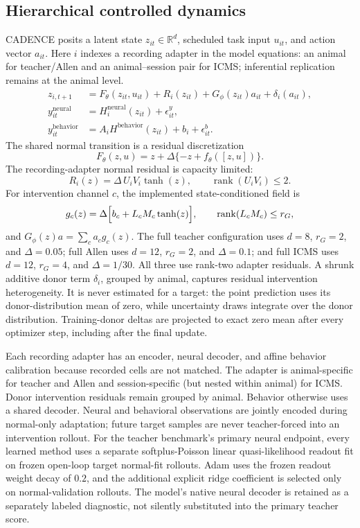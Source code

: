 \documentclass[11pt]{article}
\newcommand{\R}{\mathbb{R}}
\newcommand{\normal}{\mathrm{normal}}
\begin{document}
\subsection{Hierarchical controlled dynamics}

CADENCE posits a latent state \(z_{it}\in\R^d\), scheduled task input \(u_{it}\),
and action vector \(a_{it}\). Here \(i\) indexes a recording adapter in the
model equations: an animal for teacher/Allen and an animal--session pair for
ICMS; inferential replication remains at the animal level.
\begin{align}
  z_{i,t+1}
    &= F_\theta(z_{it},u_{it})
       + R_i(z_{it})
       + G_\phi(z_{it})a_{it}
       + \delta_i(a_{it}),
       \label{eq:dynamics}\\
  y^{\mathrm{neural}}_{it}
    &= H_i^{\mathrm{neural}}(z_{it})+\epsilon^{y}_{it},\\
  y^{\mathrm{behavior}}_{it}
    &= A_i H^{\mathrm{behavior}}(z_{it})+b_i+\epsilon^{b}_{it}.
    \label{eq:observations}
\end{align}
The shared normal transition is a residual discretization
\[
  F_\theta(z,u)=z+\Delta\{-z+f_\theta([z,u])\}.
\]
The recording-adapter normal residual is capacity limited:
\[
  R_i(z)=\Delta\,U_iV_i\tanh(z),
  \qquad
  \operatorname{rank}(U_iV_i)\leq 2.
\]
For intervention channel \(c\), the implemented state-conditioned field is
\begin{equation}
  g_c(z)
  =
  \Delta\Bigl[
    b_c+L_cM_c\tanh(z)
  \Bigr],
  \qquad
  \operatorname{rank}(L_cM_c)\leq r_G,
  \label{eq:lowrankG}
\end{equation}
and \(G_\phi(z)a=\sum_c a_c g_c(z)\). The full teacher configuration uses
\(d=8\), \(r_G=2\), and \(\Delta=0.05\); full Allen uses
\(d=12\), \(r_G=2\), and \(\Delta=0.1\); and full ICMS uses
\(d=12\), \(r_G=4\), and \(\Delta=1/30\). All three use rank-two adapter
residuals. A shrunk additive donor term \(\delta_i\), grouped by animal,
captures residual intervention
heterogeneity. It is never estimated for a target: the point prediction uses
its donor-distribution mean of zero, while uncertainty draws integrate over
the donor distribution. Training-donor deltas are projected to exact zero mean
after every optimizer step, including after the final update.

Each recording adapter has an encoder, neural decoder, and affine behavior
calibration because recorded cells are not matched. The adapter is
animal-specific for teacher and Allen and session-specific (but nested within
animal) for ICMS. Donor intervention residuals remain grouped by animal.
Behavior otherwise uses a shared decoder. Neural and behavioral observations are
jointly encoded during normal-only adaptation; future target samples are never
teacher-forced into an intervention rollout.
For the teacher benchmark's primary neural endpoint, every learned method uses
a separate softplus-Poisson linear quasi-likelihood readout fit on frozen
open-loop target \(\normal\)-fit rollouts. Adam uses the frozen readout weight
decay of \(0.2\), and the additional explicit ridge coefficient is selected
only on \(\normal\)-validation rollouts. The model's native neural decoder is
retained as a separately labeled diagnostic, not silently substituted into the
primary teacher score.
\end{document}
